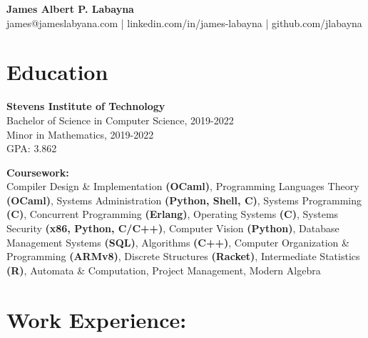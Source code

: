 \documentclass[10pt,letterpaper]{article}
\begin{document}
  \begin{center}
    \textbf{James Albert P. Labayna} \\
    \small james@jameslabyana.com | linkedin.com/in/james-labayna | github.com/jlabayna
  \end{center}
  
  \iffalse
  \begin{minipage}[t]{2in}
    \textbf{Present Address:} \\
    205 Hudson St, Apt. 602 \\
    Hoboken, NJ 07030 \\
    201.256.7526
  \end{minipage}
  \hfill
  \begin{minipage}[t]{2.4in}
    \textbf{Permanent Address:} \\
    294 S. Washington Ave., Apt. 87 \\
    Bergenfield, NJ 07030
  \end{minipage}
  \fi
  
  \section{Education}
    \textbf{Stevens Institute of Technology} \\
    Bachelor of Science in Computer Science, 2019-2022 \\
    Minor in Mathematics, 2019-2022 \\
    GPA: 3.862
    
    \noindent\textbf{Coursework:}\\
    Compiler Design \& Implementation \textbf{(OCaml)},
    Programming Languages Theory \textbf{(OCaml)},
    Systems Administration \textbf{(Python, Shell, C)},
    Systems Programming \textbf{(C)},
    Concurrent Programming \textbf{(Erlang)},
    Operating Systems \textbf{(C)},
    Systems Security \textbf{(x86, Python, C/C++)},
    Computer Vision \textbf{(Python)},
    Database Management Systems \textbf{(SQL)},
    Algorithms \textbf{(C++)},
    Computer Organization \& Programming \textbf{(ARMv8)},
    Discrete Structures \textbf{(Racket)},
    Intermediate Statistics \textbf{(R)},
    Automata \& Computation,
    Project Management,
    Modern Algebra
   
  \section{Work Experience:}
	
\end{document}
